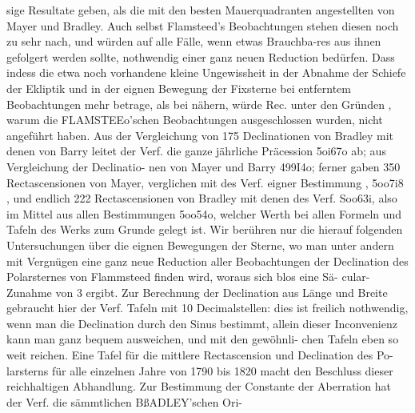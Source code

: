 \documentclass[10pt,a4paper]{article}
\begin{document}
sige Resultate  geben,  als  die  mit  den  besten  Mauerquadranten  angestellten  von  Mayer  und  Bradley.
Auch  selbst  Flamsteed's  Beobachtungen  stehen  diesen  noch  zu  sehr  nach,  und  würden  auf  alle  Fälle,
wenn  etwas  Brauchba-res  aus  ihnen  gefolgert  werden  sollte,  nothwendig  einer  ganz  neuen  Reduction
bedürfen.  Dass  indess  die  etwa  noch  vorhandene  kleine  Ungewissheit  in  der  Abnahme  der  Schiefe  der
Ekliptik  und  in  der  eignen  Bewegung  der  Fixsterne  bei  entferntem  Beobachtungen  mehr  betrage,  als
bei  nähern,  würde  Rec.  unter  den  Gründen  ,  warum  die  FLAMSTEEo'schen  Beobachtungen  ausgeschlossen
wurden,  nicht  angeführt  haben.  Aus  der  Vergleichung  von  175  Declinationen  von  Bradley  mit  denen
von  Barry  leitet  der  Verf.  die  ganze  jährliche  Präcession  5o\glqq{}i67o  ab;  aus  Vergleichung  der  Declinatio-
nen von  Mayer  und  Barry  49\glqq{}9I4o;  ferner  gaben  350  Rectascensionen  von  Mayer,  verglichen  mit  des
Verf.  eigner  Bestimmung ,  5o\glqq{}o7i8 ,  und  endlich  222  Rectascensionen  von  Bradley  mit  denen  des  Verf.
So\glqq{}o63i,  also  im  Mittel  aus  allen  Bestimmungen  5o\glqq{}o54o,  welcher  Werth  bei  allen  Formeln  und  Tafeln
des  Werks  zum  Grunde  gelegt  ist.  Wir  berühren  nur  die  hierauf  folgenden  Untersuchungen  über  die
eignen  Bewegungen  der  Sterne,  wo  man  unter  andern  mit  Vergnügen  eine  ganz  neue  Reduction  aller
Beobachtungen  der  Declination  des  Polarsternes  von  Flammsteed  finden  wird,  woraus  sich  blos  eine  Sä-
cular-Zunahme  von  3\glqq{}  ergibt.  Zur  Berechnung  der  Declination  aus  Länge  und  Breite  gebraucht  hier  der
Verf.  Tafeln  mit  10  Decimalstellen:  dies  ist  freilich  nothwendig,  wenn  man  die  Declination  durch  den
Sinus  bestimmt,  allein  dieser  Inconvenienz  kann  man  ganz  bequem  ausweichen,  und  mit  den  gewöhnli-
chen Tafeln  eben  so  weit  reichen.  Eine  Tafel  für  die  mittlere  Rectascension  und  Declination  des  Po-
larsterns für  alle  einzelnen  Jahre  von  1790  bis  1820  macht  den  Beschluss  dieser  reichhaltigen  Abhandlung.
Zur  Bestimmung  der  Constante  der  Aberration  hat  der  Verf.  die  sämmtlichen  BßADLEY'schen  Ori-
\end{document}

